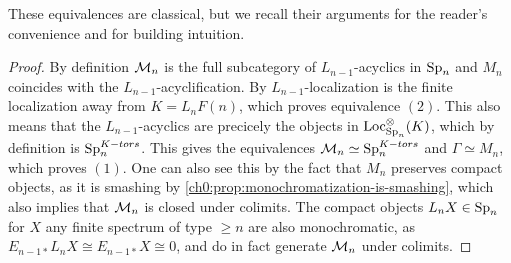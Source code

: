 These equivalences are classical, but we recall their arguments for the reader's convenience and for building intuition. 

\begin{proof}
    By definition $\mathcal{M}_{n}$ is the full subcategory of $L_{n-1}$-acyclics in $\mathrm{Sp}_{n}$ and $M_n$ coincides with the $L_{n-1}$-acyclification. By \cite[6.10]{hovey-strickland_99} $L_{n-1}$-localization is the finite localization away from $K=L_nF(n)$, which proves equivalence $(2)$. This also means that the $L_{n-1}$-acyclics are precicely the objects in $\operatorname{Loc}^\otimes_{\mathrm{Sp}_{n}}(K)$, which by definition is $\mathrm{Sp}_{n}^{K-tors}$. This gives the equivalences $\mathcal{M}_{n} \simeq \mathrm{Sp}_{n}^{K-tors}$ and $\Gamma \simeq M_n$, which proves $(1)$. One can also see this by the fact that $M_n$ preserves compact objects, as it is smashing by \cref{ch0:prop:monochromatization-is-smashing}, which also implies that $\mathcal{M}_{n}$ is closed under colimits. The compact objects $L_n X\in \mathrm{Sp}_{n}$ for $X$ any finite spectrum of type $\geq n$ are also monochromatic, as $E_{n-1 *} L_n X \cong E_{n-1 *}X\cong 0$, and do in fact generate $\mathcal{M}_{n}$ under colimits. 



    
    


\end{proof}
